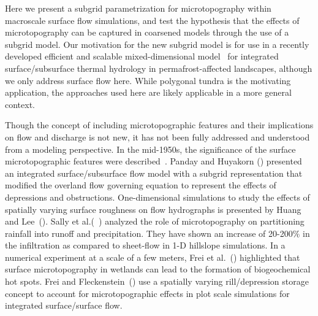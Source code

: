 \documentclass[review,11pt]{elsarticle}
\begin{document}
Here we present a subgrid parametrization for microtopography within macroscale surface flow simulations, and test the hypothesis that the effects of microtopography can be captured in coarsened models through the use of a subgrid model.
Our motivation for the new subgrid model is for use in a recently developed efficient and scalable mixed-dimensional model~\cite{jan2017} for integrated  surface/subsurface thermal hydrology in permafrost-affected landscapes, although we only address surface flow here.  
While polygonal tundra is the motivating application, the approaches used here are likely applicable in a more general context. 
%

Though the concept of including microtopographic features and their implications on flow and discharge is not new, it has not been fully addressed and understood from a modeling perspective. 
In the mid-1950s, the significance of the surface microtopographic features were described~\cite{stammers1956effect}. 
Panday and Huyakorn (\citeyear{panday2004fully}) presented an integrated surface/subsurface flow model with a subgrid representation that modified the overland flow governing equation to represent the effects of depressions and obstructions. 
One-dimensional simulations to study the effects of spatially varying surface roughness on flow hydrographs is presented by Huang and Lee~(\citeyear{huang2009influences}). Sally et al.(~\citeyear{thompson2010role}) analyzed the role of microtopography on partitioning rainfall into runoff and precipitation. They have shown an increase of 20-200$\%$ in the infiltration as compared to sheet-flow in 1-D hillslope simulations. 
In a numerical experiment at a scale of a few meters, Frei et al.~(\citeyear{frei2012surface}) highlighted that surface microtopography in wetlands can lead to the formation of biogeochemical hot spots. 
Frei and Fleckenstein~(\citeyear{frei2014representing}) use a spatially varying rill/depression storage concept to account for microtopographic effects in plot scale simulations for integrated surface/surface flow. 
%
\end{document}
